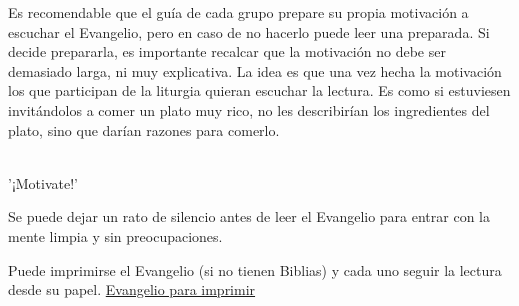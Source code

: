 Es recomendable que el guía de cada grupo prepare su propia motivación a escuchar el Evangelio, pero en caso de no hacerlo puede leer una preparada. Si decide prepararla, es importante recalcar que la motivación no debe ser demasiado larga, ni muy explicativa. La idea es que una vez hecha la motivación los que participan de la liturgia quieran escuchar la lectura. Es como si estuviesen invitándolos a comer un plato muy rico, no les describirían los ingredientes del plato, sino que darían razones para comerlo.

\hfill \\ \hfill
'¡Motivate!'
\hfill \\ \hfill
    
Se puede dejar un rato de silencio antes de leer el Evangelio para entrar con la mente limpia y sin preocupaciones.
    
Puede imprimirse el Evangelio (si no tienen Biblias) y cada uno seguir la lectura desde su papel. \href{¡link!}{\color{amarillo}Evangelio para imprimir}
\hfill \\ \hfill
